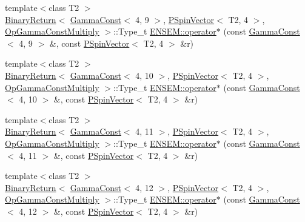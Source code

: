 \begin{DoxyCompactItemize}
\item 
{\footnotesize template$<$class T2 $>$ }\\\mbox{\hyperlink{structENSEM_1_1BinaryReturn}{Binary\+Return}}$<$ \mbox{\hyperlink{classENSEM_1_1GammaConst}{Gamma\+Const}}$<$ 4, 9 $>$, \mbox{\hyperlink{classENSEM_1_1PSpinVector}{P\+Spin\+Vector}}$<$ T2, 4 $>$, \mbox{\hyperlink{structENSEM_1_1OpGammaConstMultiply}{Op\+Gamma\+Const\+Multiply}} $>$\+::Type\+\_\+t \mbox{\hyperlink{group__primspinvector_ga61476a03c8d043d2e32e6ba22ec70bb5}{E\+N\+S\+E\+M\+::operator$\ast$}} (const \mbox{\hyperlink{classENSEM_1_1GammaConst}{Gamma\+Const}}$<$ 4, 9 $>$ \&, const \mbox{\hyperlink{classENSEM_1_1PSpinVector}{P\+Spin\+Vector}}$<$ T2, 4 $>$ \&r)
\item 
{\footnotesize template$<$class T2 $>$ }\\\mbox{\hyperlink{structENSEM_1_1BinaryReturn}{Binary\+Return}}$<$ \mbox{\hyperlink{classENSEM_1_1GammaConst}{Gamma\+Const}}$<$ 4, 10 $>$, \mbox{\hyperlink{classENSEM_1_1PSpinVector}{P\+Spin\+Vector}}$<$ T2, 4 $>$, \mbox{\hyperlink{structENSEM_1_1OpGammaConstMultiply}{Op\+Gamma\+Const\+Multiply}} $>$\+::Type\+\_\+t \mbox{\hyperlink{group__primspinvector_gab079c599559400400256e044d153a9f0}{E\+N\+S\+E\+M\+::operator$\ast$}} (const \mbox{\hyperlink{classENSEM_1_1GammaConst}{Gamma\+Const}}$<$ 4, 10 $>$ \&, const \mbox{\hyperlink{classENSEM_1_1PSpinVector}{P\+Spin\+Vector}}$<$ T2, 4 $>$ \&r)
\item 
{\footnotesize template$<$class T2 $>$ }\\\mbox{\hyperlink{structENSEM_1_1BinaryReturn}{Binary\+Return}}$<$ \mbox{\hyperlink{classENSEM_1_1GammaConst}{Gamma\+Const}}$<$ 4, 11 $>$, \mbox{\hyperlink{classENSEM_1_1PSpinVector}{P\+Spin\+Vector}}$<$ T2, 4 $>$, \mbox{\hyperlink{structENSEM_1_1OpGammaConstMultiply}{Op\+Gamma\+Const\+Multiply}} $>$\+::Type\+\_\+t \mbox{\hyperlink{group__primspinvector_ga4bbdc1bc935fc4378105903d7b0fb65d}{E\+N\+S\+E\+M\+::operator$\ast$}} (const \mbox{\hyperlink{classENSEM_1_1GammaConst}{Gamma\+Const}}$<$ 4, 11 $>$ \&, const \mbox{\hyperlink{classENSEM_1_1PSpinVector}{P\+Spin\+Vector}}$<$ T2, 4 $>$ \&r)
\item 
{\footnotesize template$<$class T2 $>$ }\\\mbox{\hyperlink{structENSEM_1_1BinaryReturn}{Binary\+Return}}$<$ \mbox{\hyperlink{classENSEM_1_1GammaConst}{Gamma\+Const}}$<$ 4, 12 $>$, \mbox{\hyperlink{classENSEM_1_1PSpinVector}{P\+Spin\+Vector}}$<$ T2, 4 $>$, \mbox{\hyperlink{structENSEM_1_1OpGammaConstMultiply}{Op\+Gamma\+Const\+Multiply}} $>$\+::Type\+\_\+t \mbox{\hyperlink{group__primspinvector_gacda74bfacd9c872e7d821f2355890a01}{E\+N\+S\+E\+M\+::operator$\ast$}} (const \mbox{\hyperlink{classENSEM_1_1GammaConst}{Gamma\+Const}}$<$ 4, 12 $>$ \&, const \mbox{\hyperlink{classENSEM_1_1PSpinVector}{P\+Spin\+Vector}}$<$ T2, 4 $>$ \&r)

\end{DoxyCompactItemize}
